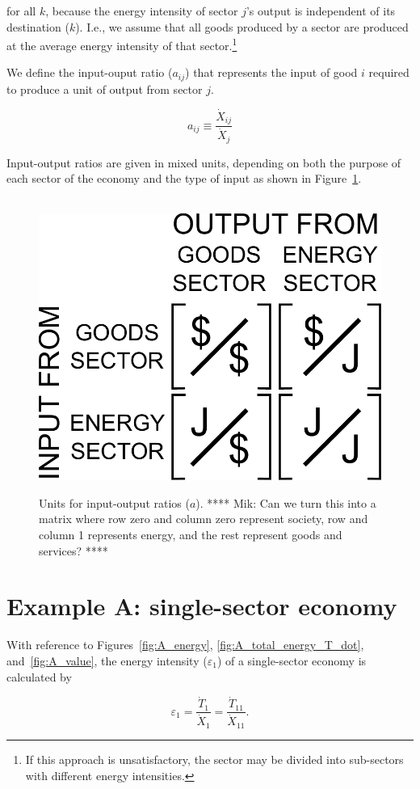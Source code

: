 \noindent{}for all $k$, because the energy intensity 
of sector $j$'s output is independent of its destination ($k$). 
I.e., we assume that all goods produced by a sector 
are produced at the average energy intensity 
of that sector.\footnote{If this approach is unsatisfactory, 
the sector may be divided into sub-sectors 
with different energy intensities.}

We define the input-ouput ratio ($a_{ij}$) that represents the input 
of good $i$ required to produce a unit of output from sector $j$.

\begin{equation} \label{eq:aij_def}
	a_{ij} \equiv \frac{\dot{X}_{ij}}{\dot{X}_{j}}
\end{equation}

Input-output ratios are given in mixed units, 
depending on both the purpose of each sector of the economy 
and the type of input as shown in Figure~\ref{fig:A_matrix_units}.

\begin{figure}[h!]
\centering\
\includegraphics[width=0.4\linewidth]{Part_2/Chapter_Intensity/images/I-O_units.pdf}
\caption{Units for input-output ratios ($a$). **** Mik: Can we turn this
into a matrix where row zero and column zero represent society, 
row and column 1 represents energy, and the rest represent goods and services? ****}
\label{fig:A_matrix_units}
\end{figure}


\section{Example A: single-sector economy} %

With reference to Figures~\ref{fig:A_energy}, 
\ref{fig:A_total_energy_T_dot}, 
and~\ref{fig:A_value},
the energy intensity ($\varepsilon_{1}$) of a single-sector economy is calculated by

\begin{equation} \label{eq:A-energy_intensity}
	\varepsilon_{1} 
	= \frac{\dot{T}_{1}}{\dot{X}_{1}} 
	= \frac{\dot{T}_{11}}{\dot{X}_{11}}.
\end{equation}

